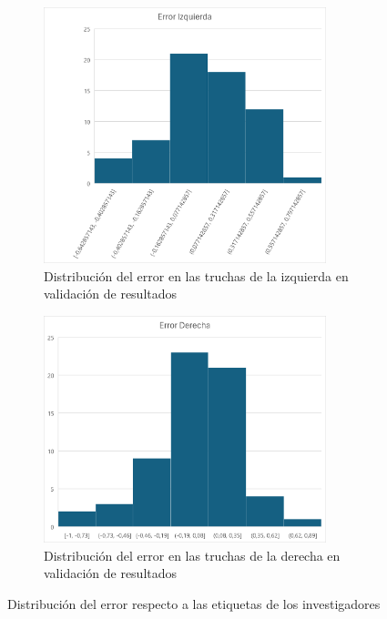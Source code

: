 \begin{figure}[H]
    \centering
    \begin{subfigure}[b]{0.7\textwidth}
        \centering
        \includegraphics[width=0.9\textwidth]{images/7/ErrorIzquierda.png}
        \caption{Distribución del error en las truchas de la izquierda en validación de resultados}
    \end{subfigure}
    \begin{subfigure}[b]{0.7\textwidth}
        \centering
        \includegraphics[width=0.9\textwidth]{images/7/ErrorDerecha.png}
        \caption{Distribución del error en las truchas de la derecha en validación de resultados}
    \end{subfigure}
    \caption{Distribución del error respecto a las etiquetas de los investigadores}
    \label{fig:HistogramasError}
\end{figure}

